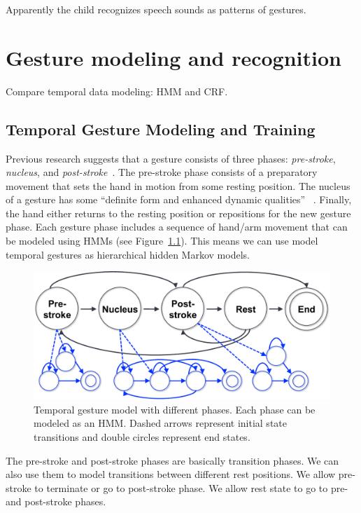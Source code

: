 \begin{savequote}
Apparently the child recognizes speech sounds as patterns of gestures.
\end{savequote}
\chapter{Gesture modeling and recognition}

Compare temporal data modeling: HMM and CRF. 

\section{Temporal Gesture Modeling and Training}

Previous research suggests that
a gesture consists of three phases: \textit{pre-stroke}, \textit{nucleus}, and \textit{post-stroke}~\cite{Pavlovic97}. The pre-stroke phase consists
of a preparatory movement that sets the hand in motion from some resting position.
The nucleus of a gesture has some ``definite form and enhanced dynamic qualities''
~\cite{kendon86}. Finally, the hand either returns to the resting position or repositions
for the new gesture phase. Each gesture
phase includes a sequence of hand/arm movement that can be modeled using HMMs (see Figure~\ref{fig:hmm}). 
This means we can use model temporal gestures as hierarchical hidden Markov
models.

\begin{figure}[tbh]
\centering
\includegraphics[clip, width=1\columnwidth]{figures/hmm.pdf}
\caption{Temporal gesture model with different phases. Each phase can be modeled as an HMM. Dashed arrows represent
initial state transitions and double circles
represent end states.}
\label{fig:hmm}
\end{figure}

The pre-stroke and post-stroke phases are basically transition phases. We
can also use them to model transitions between different rest positions. We
allow pre-stroke to terminate or go to post-stroke phase. We allow rest state to
go to pre- and post-stroke phases.

